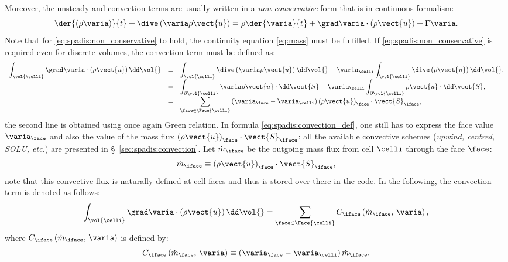 Moreover, the unsteady and convection terms are usually written in a \emph{non-conservative} form that is in continuous formalism:
\begin{equation}\label{eq:spadis:non_conservative}
 \der{ \left( \rho\varia \right)}{t} + \dive \left(  \varia  \rho \vect{u}\right) = \rho \der{\varia }{t} + \grad \varia \cdot \left( \rho \vect{u}\right) + \Gamma \varia.
 \end{equation}
 Note that for \eqref{eq:spadis:non_conservative} to hold, the continuity equation \eqref{eq:mass} must be fulfilled. 
 If \eqref{eq:spadis:non_conservative} is required even for discrete volumes, the convection term must be defined as:
 \begin{equation}\label{eq:spadis:convection_def}
 \begin{array}{r c l}
\displaystyle \int_{\vol{\celli}} \grad \varia \cdot \left( \rho \vect{u} \right) \dd \vol{} &\equiv &
\displaystyle \int_{\vol{\celli}}  \dive \left( \varia \rho \vect{u} \right) \dd \vol{}  - \varia_\celli  \int_{\vol{\celli}} \dive \left(\rho \vect{u} \right) \dd \vol{}, \\
 &=& 
 \displaystyle \int_{ \partial \vol{\celli}}   \varia \rho \vect{u} \cdot \dd \vect{S}  - \varia_\celli  \int_{ \partial \vol{\celli}} \rho \vect{u} \cdot \dd \vect{S}, \\
 &=& 
\displaystyle \sum_{\face \in \Face{\celli}} \left(\varia_\face - \varia_\celli \right) \left(\rho \vect{u}\right)_\face \cdot \vect{S}_{\iface},
 \end{array}
 \end{equation}
the second line is obtained using once again Green relation. In formula \eqref{eq:spadis:convection_def}, one still has to express the face value
 $\varia_\face$ and also the value of the mass flux $\left(\rho \vect{u}\right)_\face\cdot \vect{S}_{\iface}$: all the available convective schemes (\emph{upwind, centred, SOLU, etc.}) are presented in \S~\ref{sec:spadis:convection}. Let $\dot{m}_\iface$ be the outgoing
 mass flux from cell $\celli$ through the face $\face$:
  \begin{equation}\label{eq:spadis:massflux_def}
\dot{m}_\iface \equiv \left(\rho \vect{u}\right)_\face \cdot \vect{S}_{\iface},
 \end{equation}
note that this convective flux is naturally defined at cell faces and thus is stored over there in the code. In the following, the convection term is denoted as follows:
\begin{equation}\label{eq:spadis:convection_notation}
\displaystyle \int_{\vol{\celli}} \grad \varia \cdot \left( \rho \vect{u} \right) \dd \vol{} 
=
\displaystyle \sum_{\face \in \Face{\celli}} C_\iface \left( \dot{m}_\iface , \, \varia \right),
 \end{equation}
where $C_\iface \left(  \dot{m}_\iface  , \, \varia\right)$ is defined by:
\begin{equation}\label{eq:spadis:convection_flux}
C_\iface \left(\dot{m}_\face , \, \varia \right) \equiv  \left(\varia_\face - \varia_\celli \right) \dot{m}_\iface.
 \end{equation}

